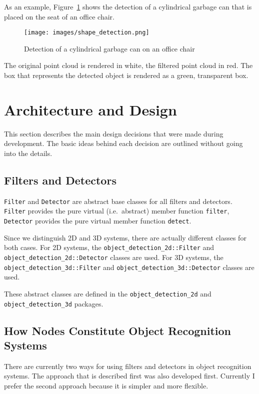 \documentclass{article}
\newcommand{\code}[1]{\texttt{#1}}
\begin{document}
As an example, Figure~\ref{fig:shape_detection} shows the detection of a
cylindrical garbage can that is placed on the seat of an office chair.
\begin{figure}
	\centering
	\texttt{[image: images/shape\_detection.png]}
	\caption{Detection of a cylindrical garbage can on an office chair}
	\label{fig:shape_detection}
\end{figure}
The original point cloud is rendered in white, the filtered point cloud in red.
The box that represents the detected object is rendered as a green, transparent box.



\section{Architecture and Design}
\label{sec:design}

This section describes the main design decisions that were made
during development.
The basic ideas behind each decision are outlined without
going into the details.


\subsection{Filters and Detectors}

\code{Filter} and \code{Detector} are abstract base classes for all filters
and detectors.
\code{Filter} provides the pure virtual (i.e.\ abstract) member function \code{filter},
\code{Detector} provides the pure virtual member function \code{detect}.

Since we distinguish 2D and 3D systems, there are actually different
classes for both cases.
For 2D systems, the \code{object\_detection\_2d::Filter} and
\code{object\_detection\_2d::Detector} classes are used.
For 3D systems, the \code{object\_detection\_3d::Filter} and
\code{object\_detection\_3d::Detector} classes are used.

These abstract classes are defined in the \code{object\_detection\_2d} and
\code{object\_detection\_3d} packages.


\subsection{How Nodes Constitute Object Recognition Systems}
\label{sec:nodes}

There are currently two ways for using filters and detectors in object
recognition systems.
The approach that is described first was also developed first.
Currently I prefer the second approach because it is simpler and more flexible.
\end{document}
